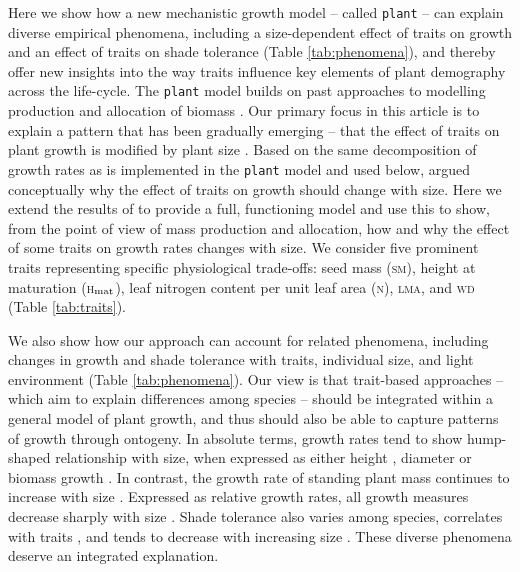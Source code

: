 \documentclass[9pt,twocolumn,twoside,lineno]{pnas-new}
\newcommand{\plant}{\texttt{plant}}
\newcommand{\lma}{\textsc{lma}}
\newcommand{\wood}{\textsc{wd}}
\newcommand{\seed}{\textsc{sm}}
\newcommand{\hmat}{\textsc{h}$_{\rm mat}$}
\newcommand{\nitrogen}{\textsc{n}}
\begin{document}
Here we show how a new mechanistic growth model -- called {\plant} \citep{Falster-2016} -- can explain diverse empirical phenomena, including a size-dependent effect of traits on growth and an effect of traits on shade tolerance (Table \ref{tab:phenomena}), and thereby offer new insights into the way traits influence key elements of plant demography across the life-cycle. The {\plant} model builds on past approaches to modelling production and allocation of biomass \citep[e.g.][]{Givnish-1988, Yokozawa-1995,Makela-1997, Moorcroft-2001, Sitch-2008, Falster-2011, King-2011, Gibert-2016}. Our primary focus in this article is to explain a pattern that has been gradually emerging -- that the effect of traits on plant growth is modified by plant size \citep{Ruger-2012, Iida-2014, Gibert-2016}. Based on the same decomposition of growth rates as is implemented in the {\plant} model and used below, \citep{Gibert-2016} argued conceptually why the effect of traits on growth should change with size. Here we extend the results of \citep{Gibert-2016} to provide a full, functioning model and use this to show, from the point of view of mass production and allocation, how and why the effect of some traits on growth rates changes with size. We consider five prominent traits representing specific physiological trade-offs: seed mass ({\seed}), height at maturation ({\hmat}), leaf nitrogen content per unit leaf area ({\nitrogen}),  {\lma}, and {\wood} (Table \ref{tab:traits}).  

We also show how our approach can account for related phenomena, including changes in growth and shade tolerance with traits, individual size, and light environment (Table \ref{tab:phenomena}). Our view is that trait-based approaches -- which aim to explain differences among species -- should be integrated within a general model of plant growth, and thus should also be able to capture patterns of growth through ontogeny. In absolute terms, growth rates tend to show hump-shaped relationship with size, when expressed as either height \citep{Sillett-2010, King-2011}, diameter \citep{Canham-2004, Canham-2006, Herault-2011} or biomass growth \citep{Givnish-1988, Koch-2004}. In contrast, the growth rate of standing plant mass continues to increase with size \citep{Sillett-2010, Stephenson-2014}. Expressed as relative growth rates, all growth measures decrease sharply with size \citep{Rees-2010, Iida-2014}. Shade tolerance also varies among species, correlates with traits \citep{Messier-1999, Lusk-2008, Poorter-2006}, and tends to decrease with increasing size \citep{Givnish-1988, Kneeshaw-2006, Lusk-2008}. These diverse phenomena deserve an integrated explanation.
\end{document}
